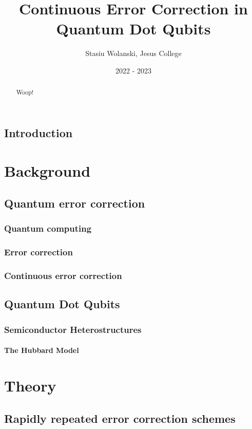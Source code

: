 \documentclass{report}
\title{Continuous Error Correction in Quantum Dot Qubits}
\author{Stasiu Wolanski, Jesus College}
\date{2022 - 2023}
\begin{document}
\maketitle

\begin{abstract}
    Woop!
\end{abstract}

\tableofcontents

\section{Introduction}
\chapter{Background}

\section{Quantum error correction}
\subsection{Quantum computing}
\subsection{Error correction}
\subsection{Continuous error correction}


\section{Quantum Dot Qubits}
\subsection{Semiconductor Heterostructures}
\subsubsection{The Hubbard Model} \label{sec:hubbard_model}

\chapter{Theory}

\section{Rapidly repeated error correction schemes} \label{sec:repeat_analysis}
\end{document}
